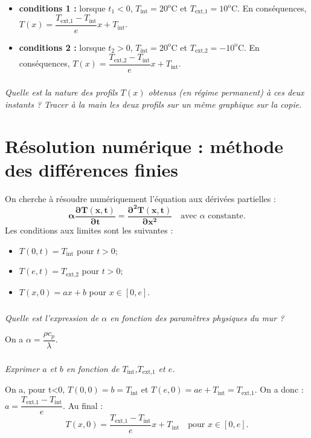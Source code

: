 \documentclass[10pt,fleqn]{article} %
\begin{document}
\begin{multicols}{2}
\begin{corrige}
\begin{itemize}
\item \textbf{conditions 1 : } lorsque $t_1 <0$,  $T_{\text{int}}=20^{\text{o}} \text{C}$ et $T_{\text{ext,1}}=10^{\text{o}} \text{C}$. En conséquences, $T(x) =  \dfrac{T_{\text{ext,1}} -T_{\text{int}}}{e} x + T_{\text{int}} $.
\item \textbf{conditions 2 : }  lorsque $t_2 >0$,  $T_{\text{int}}=20^{\text{o}} \text{C}$ et $T_{\text{ext,2}}=-10^{\text{o}} \text{C}$. En conséquences, $T(x) =  \dfrac{T_{\text{ext,2}} -T_{\text{int}}}{e} x + T_{\text{int}} $.
\end{itemize}
\end{corrige}
\else
\fi


\subparagraph{}\textit{Quelle est la nature des profils $T(x)$ obtenus (en régime permanent) à ces deux instants ? Tracer à la main les deux profils sur un même graphique sur la copie.}

\section*{Résolution numérique : méthode des différences finies}

\ifprof
\else
On cherche à résoudre numériquement l'équation aux dérivées partielles : 
\begin{equation}
\mathbf{\alpha \dfrac{\partial T(x,t)}{\partial t} = \dfrac{\partial^2 T(x,t)}{\partial x^2}} \quad \text{avec }\alpha \text{ constante.}
\end{equation}
Les conditions aux limites sont les suivantes :
\begin{itemize}
\item $T(0,t)=T_{\text{int}}$ pour $t>0$;
\item $T(e,t)=T_{\text{ext,2}}$ pour $t>0$;
\item $T(x,0)=ax + b$ pour $x\in[0,e]$.
\end{itemize}
\fi

\subparagraph{}\textit{Quelle est l'expression de $\alpha$ en fonction des paramètres physiques du mur ?}
\ifprof
\begin{corrige}
On a $\alpha =\dfrac{\rho c_p}{\lambda}$.

\end{corrige}

\else
\fi

\subparagraph{\label{q_tini}}\textit{Exprimer $a$ et $b$ en fonction de $T_{\text{int}}$,$T_{\text{ext,1}}$ et $e$.}
\ifprof
\begin{corrige}
On a, pour t<0, $T(0,0)= b = T_{\text{int}}$ et  $T(e,0)= ae+ T_{\text{int}}= T_{\text{ext,1}}$. On a donc : $a= \dfrac{T_{\text{ext,1}}- T_{\text{int}}}{e}$. Au final :
$$T(x,0)=\dfrac{T_{\text{ext,1}}- T_{\text{int}}}{e} x + T_{\text{int}} \quad \text{pour } x\in[0,e].$$
\end{corrige}
\else
\fi
\ifprof
\else
\vspace{.5cm}


\end{multicols}
\end{document}
